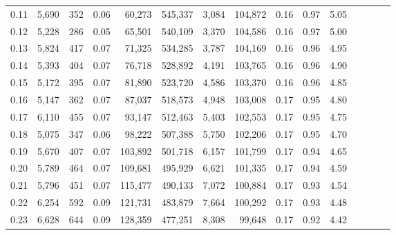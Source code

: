 \begin{tabular}{rrrcrrrrrrrrrrr}
0.11 &   5,690 &    352 &                                       0.06 &   60,273 &  545,337 &    3,084 &  104,872 &  0.16 &  0.97 &                         5.05 \\
0.12 &   5,228 &    286 &                                       0.05 &   65,501 &  540,109 &    3,370 &  104,586 &  0.16 &  0.97 &                         5.00 \\
0.13 &   5,824 &    417 &                                       0.07 &   71,325 &  534,285 &    3,787 &  104,169 &  0.16 &  0.96 &                         4.95 \\
0.14 &   5,393 &    404 &                                       0.07 &   76,718 &  528,892 &    4,191 &  103,765 &  0.16 &  0.96 &                         4.90 \\
0.15 &   5,172 &    395 &                                       0.07 &   81,890 &  523,720 &    4,586 &  103,370 &  0.16 &  0.96 &                         4.85 \\
0.16 &   5,147 &    362 &                                       0.07 &   87,037 &  518,573 &    4,948 &  103,008 &  0.17 &  0.95 &                         4.80 \\
0.17 &   6,110 &    455 &                                       0.07 &   93,147 &  512,463 &    5,403 &  102,553 &  0.17 &  0.95 &                         4.75 \\
0.18 &   5,075 &    347 &                                       0.06 &   98,222 &  507,388 &    5,750 &  102,206 &  0.17 &  0.95 &                         4.70 \\
0.19 &   5,670 &    407 &                                       0.07 &  103,892 &  501,718 &    6,157 &  101,799 &  0.17 &  0.94 &                         4.65 \\
0.20 &   5,789 &    464 &                                       0.07 &  109,681 &  495,929 &    6,621 &  101,335 &  0.17 &  0.94 &                         4.59 \\
0.21 &   5,796 &    451 &                                       0.07 &  115,477 &  490,133 &    7,072 &  100,884 &  0.17 &  0.93 &                         4.54 \\
0.22 &   6,254 &    592 &                                       0.09 &  121,731 &  483,879 &    7,664 &  100,292 &  0.17 &  0.93 &                         4.48 \\
0.23 &   6,628 &    644 &                                       0.09 &  128,359 &  477,251 &    8,308 &   99,648 &  0.17 &  0.92 &                         4.42 \\

\end{tabular}
